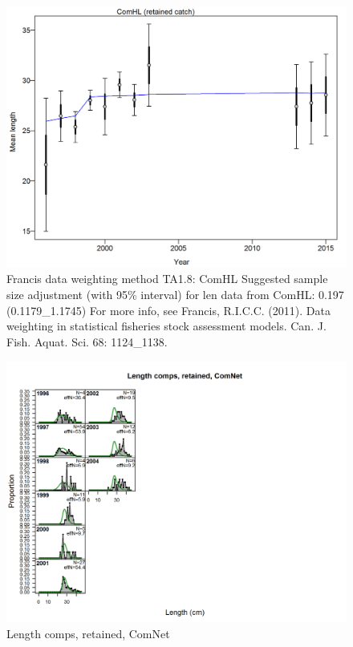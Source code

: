 \documentclass[12pt,]{article}
\begin{document}
\begin{figure}[htbp]
\centering
\includegraphics{./r4ss/plots_mod1/comp_lenfit_data_weighting_TA1.8_ComHL.png}
\caption{Francis data weighting method TA1.8: ComHL Suggested sample
size adjustment (with 95\% interval) for len data from ComHL: 0.197
(0.1179\_1.1745) For more info, see Francis, R.I.C.C. (2011). Data
weighting in statistical fisheries stock assessment models. Can. J.
Fish. Aquat. Sci. 68: 1124\_1138.
\label{fig:mod1_4_comp_lenfit_data_weighting_TA1.8_ComHL}}
\end{figure}

\begin{figure}[htbp]
\centering
\includegraphics{./r4ss/plots_mod1/comp_lenfit_flt2mkt2.png}
\caption{Length comps, retained, ComNet
\label{fig:mod1_5_comp_lenfit_flt2mkt2}}
\end{figure}
\end{document}
